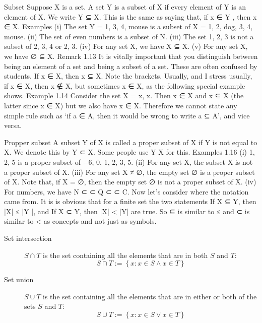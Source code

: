 Subset
Suppose X is a set. A set Y is a subset of X if every element of Y is an element of X. We write Y ⊆ X. This is the same as saying that, if x ∈ Y , then x ∈ X. 
Examples
(i) The set Y = {1, {3, 4}, mouse} is a subset of X = {1, 2, dog, {3, 4}, mouse}. 
(ii) The set of even numbers is a subset of N.
(iii) The set {1, 2, 3} is not a subset of {2, 3, 4} or {2, 3}. 
(iv) For any set X, we have X ⊆ X. 
(v) For any set X, we have ∅ ⊆ X. 
Remark 1.13 It is vitally important that you distinguish between being an element of a set and being a subset of a set. These are often confused by students. If x ∈ X, then {x} ⊆ X. Note the brackets. Usually, and I stress usually, if x ∈ X, then {x} ∉ X, but sometimes {x} ∈ X, as the following special example shows. 
Example 1.14 Consider the set X = {x, {x}}. Then x ∈ X and {x} ⊆ X (the latter since x ∈ X) but we also have {x} ∈ X. Therefore we cannot state any simple rule such as ‘if a ∈ A, then it would be wrong to write a ⊆ A’, and vice versa.

Propper subset
A subset Y of X is called a proper subset of X if Y is not equal to X. We denote this by Y ⊂ X. Some people use Y  X for this. 
Examples 1.16 
(i) {1, 2, 5} is a proper subset of {−6, 0, 1, 2, 3, 5}. 
(ii) For any set X, the subset X is not a proper subset of X. 
(iii) For any set X ≠ ∅, the empty set ∅ is a proper subset of X. Note that, if X = ∅, then the empty set ∅ is not a proper subset of X.
(iv) For numbers, we have N ⊂  ⊂ Q ⊂  ⊂ C.
Now let’s consider where the notation came from. It is is obvious that for a finite set the two statements If X ⊆ Y, then |X| ≤ |Y |, and If X ⊂ Y, then |X| < |Y| are true. So ⊆ is similar to ≤ and ⊂ is similar to < as concepts and not just as symbols.




\begin{description}
\item[Set intersection] $S \cap T$ is the set containing all the elements that are in both $S$ and $T$:
\begin{equation}
S \cap T := \left\{{x: x \in S \land x \in T}\right\}
\end{equation}
\item[Set union] $S \cup T$ is the set containing all the elements that are in either or both of the sets $S$ and $T$:
\begin{equation}
S \cup T := \left\{{x: x \in S \lor x \in T}\right\}
\end{equation} 

\end{description}

